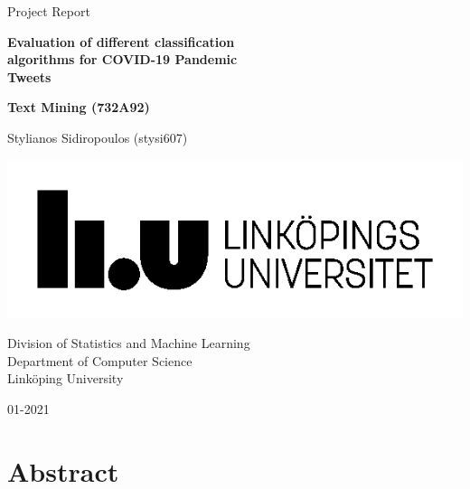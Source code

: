 \documentclass[
]{article}
\author{}
\date{\vspace{-2.5em}}
\begin{document}
\begin{titlepage}
	\clearpage\thispagestyle{empty}
	\centering
	\vspace{2cm}

	{\large Project Report \par}
	\vspace{3cm}
	{\Huge \textbf{Evaluation of different classification \\ algorithms for COVID-19 Pandemic \\ Tweets}} \\
	\vspace{1cm}
	{\large \textbf{Text Mining (732A92)} \par}
	\vspace{3cm}
	{\normalsize Stylianos Sidiropoulos (stysi607) \par}
	\vspace{2cm}

    \includegraphics{liu_logo.png}
    
    \vspace{2cm}
    
	{\normalsize Division of Statistics and Machine Learning \\ 
		Department of Computer Science \\
		Linköping University \par}
		
	{\normalsize 01-2021 \par}
	\vspace{2cm}
	
	\pagebreak

\end{titlepage}

\tableofcontents{}

\clearpage

\hypertarget{abstract}{%
\section*{Abstract}\label{abstract}}
\end{document}
